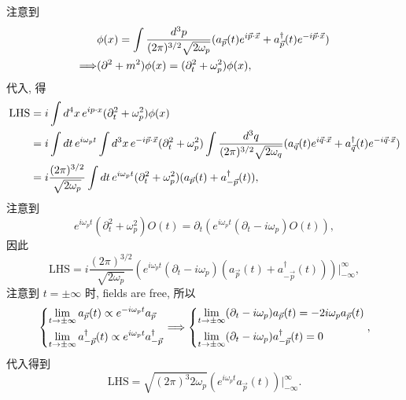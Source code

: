 \begin{itemize}
	\begin{tcolorbox}[title=proof:]
		注意到
		\begin{align}
			& \phi(x) = \int \frac{d^3 p}{(2 \pi)^{3 / 2} \sqrt{2 \omega_p}} (a_{\vec{p}}(t) e^{i \vec{p} \cdot \vec{x}} + a^\dag_{\vec{p}}(t) e^{- i \vec{p} \cdot \vec{x}}) \notag \\
			\Longrightarrow & (\partial^2 + m^2) \phi(x) = (\partial_t^2 + \omega_p^2) \phi(x),
		\end{align}
		代入, 得
		\begin{align}
			\text{LHS} &= i \int d^4 x \, e^{i p \cdot x} (\partial_t^2 + \omega_p^2) \phi(x) \notag \\
			&= i \int dt \, e^{i \omega_p t} \int d^3 x \, e^{- i \vec{p} \cdot \vec{x}} (\partial_t^2 + \omega_p^2) \int \frac{d^3 q}{(2 \pi)^{3 / 2} \sqrt{2 \omega_q}} (a_{\vec{q}}(t) e^{i \vec{q} \cdot \vec{x}} + a^\dag_{\vec{q}}(t) e^{- i \vec{q} \cdot \vec{x}}) \notag \\
			&= i \frac{(2 \pi)^{3 / 2}}{\sqrt{2 \omega_p}} \int dt \, e^{i \omega_p t} (\partial_t^2 + \omega_p^2) (a_{\vec{p}}(t) + a^\dag_{- \vec{p}}(t)),
		\end{align}
		注意到
		\begin{equation}
			e^{i \omega_p t} (\partial_t^2 + \omega_p^2) O(t) = \partial_t(e^{i \omega_p t} (\partial_t - i \omega_p) O(t)),
		\end{equation}
		因此
		\begin{equation}
			\text{LHS} = i \frac{(2 \pi)^{3 / 2}}{\sqrt{2 \omega_p}} (e^{i \omega_p t} (\partial_t - i \omega_p) (a_{\vec{p}}(t) + a^\dag_{- \vec{p}}(t))) \Big|^\infty_{- \infty},
		\end{equation}
		注意到 $t = \pm \infty$ 时, fields are free, 所以
		\begin{equation} \label{the S0matrix and time-ordered products.1.9}
			\begin{dcases}
				\lim_{t \rightarrow \pm \infty} a_{\vec{p}}(t) \propto e^{- i \omega_p t} a_{\vec{p}} \\
				\lim_{t \rightarrow \pm \infty} a^\dag_{- \vec{p}}(t) \propto e^{i \omega_p t} a^\dag_{- \vec{p}}
			\end{dcases} \Longrightarrow \begin{dcases}
				\lim_{t \rightarrow \pm \infty} (\partial_t - i \omega_p) a_{\vec{p}}(t) = - 2 i \omega_p a_{\vec{p}}(t) \\
				\lim_{t \rightarrow \pm \infty} (\partial_t - i \omega_p) a^\dag_{- \vec{p}}(t) = 0
			\end{dcases},
		\end{equation}
		代入得到
		\begin{equation}
			\text{LHS} = \sqrt{(2 \pi)^3 2 \omega_p} (e^{i \omega_p t} a_{\vec{p}}(t)) \Big|^\infty_{- \infty}.
		\end{equation}
	\end{tcolorbox}
	

\end{itemize}
